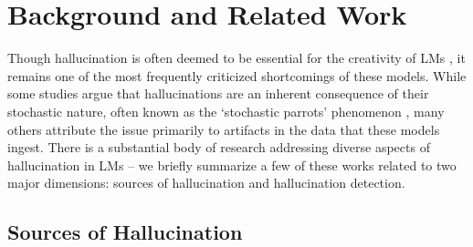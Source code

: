 \section{Background and Related Work}
\label{sec:related_work}

Though hallucination is often deemed to be essential for the creativity of LMs \citep{math11102320, 10.1145/3652102}, it remains one of the most frequently criticized shortcomings of these models. While some studies argue that hallucinations are an inherent consequence of their stochastic nature, often known as the `stochastic parrots' phenomenon \citep{10.1145/3442188.3445922}, many others attribute the issue primarily to artifacts in the data that these models ingest. There is a substantial body of research addressing diverse aspects of hallucination in LMs -- we briefly summarize a few of these works related to two major dimensions: sources of hallucination and hallucination detection.

\subsection{Sources of Hallucination} 



